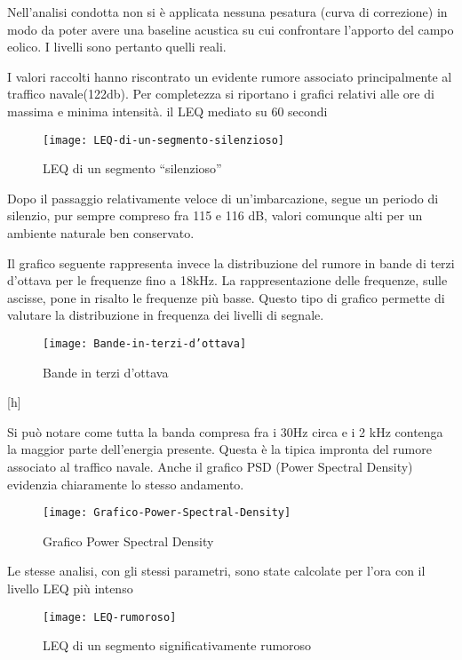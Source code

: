 Nell’analisi condotta non si è applicata nessuna pesatura (curva di correzione) in modo da poter avere una baseline acustica su cui confrontare l’apporto del campo eolico. 
I livelli sono pertanto quelli reali.

I valori raccolti hanno riscontrato un evidente rumore associato principalmente al traffico navale(122db). 
Per completezza si riportano i grafici relativi alle ore di massima e minima intensità. il LEQ mediato su 60 secondi 

\begin{figure}[h]
\centering
\texttt{[image: LEQ-di-un-segmento-silenzioso]}
\caption{LEQ di un segmento “silenzioso”}
\end{figure}

Dopo il passaggio relativamente veloce di un’imbarcazione, segue un periodo di silenzio, pur sempre compreso fra 115 e 116 dB, valori comunque alti per un ambiente naturale ben conservato.

Il grafico seguente rappresenta invece la distribuzione del rumore in bande di terzi d’ottava per le frequenze fino a 18kHz. 
La rappresentazione delle frequenze, sulle ascisse, pone in risalto le frequenze più basse. 
Questo tipo di grafico permette di valutare la distribuzione in frequenza dei livelli di segnale.

\begin{figure}[h]
\centering
\texttt{[image: Bande-in-terzi-d'ottava]}
\caption{Bande in terzi d’ottava}
\end{figure}[h]

Si può notare come tutta la banda compresa fra i 30Hz circa e i 2 kHz contenga la maggior parte dell’energia presente. 
Questa è la tipica impronta del rumore associato al traffico navale. 
Anche il grafico PSD (Power Spectral Density) evidenzia chiaramente lo stesso andamento.

\begin{figure}[h]
\centering
\texttt{[image: Grafico-Power-Spectral-Density]}
\caption{Grafico Power Spectral Density}
\end{figure}

Le stesse analisi, con gli stessi parametri, sono state calcolate per l’ora con il livello LEQ più intenso 

\begin{figure}[h]
\centering
\texttt{[image: LEQ-rumoroso]}
\caption{LEQ di un segmento significativamente rumoroso}
\end{figure}

